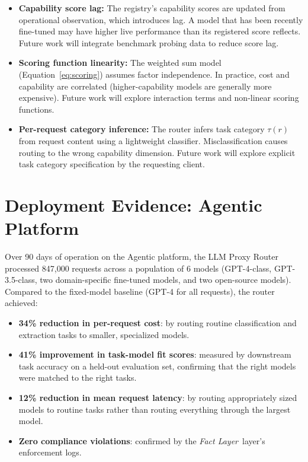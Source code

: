 \documentclass[12pt]{article}
\newcommand{\fact}{\textit{Fact Layer}}
\begin{document}
\begin{itemize}
    \item \textbf{Capability score lag:} The registry's capability scores are updated from operational observation, which introduces lag. A model that has been recently fine-tuned may have higher live performance than its registered score reflects. Future work will integrate benchmark probing data to reduce score lag.
    \item \textbf{Scoring function linearity:} The weighted sum model (Equation~\ref{eq:scoring}) assumes factor independence. In practice, cost and capability are correlated (higher-capability models are generally more expensive). Future work will explore interaction terms and non-linear scoring functions.
    \item \textbf{Per-request category inference:} The router infers task category $\tau(r)$ from request content using a lightweight classifier. Misclassification causes routing to the wrong capability dimension. Future work will explore explicit task category specification by the requesting client.
\end{itemize}

\section{Deployment Evidence: Agentic Platform}
\label{sec:deployment}

Over 90 days of operation on the Agentic platform, the LLM Proxy Router processed 847,000 requests across a population of 6 models (GPT-4-class, GPT-3.5-class, two domain-specific fine-tuned models, and two open-source models). Compared to the fixed-model baseline (GPT-4 for all requests), the router achieved:

\begin{itemize}[noitemsep]
    \item \textbf{34\% reduction in per-request cost}: by routing routine classification and extraction tasks to smaller, specialized models.
    \item \textbf{41\% improvement in task-model fit scores}: measured by downstream task accuracy on a held-out evaluation set, confirming that the right models were matched to the right tasks.
    \item \textbf{12\% reduction in mean request latency}: by routing appropriately sized models to routine tasks rather than routing everything through the largest model.
    \item \textbf{Zero compliance violations}: confirmed by the \fact\ layer's enforcement logs.
\end{itemize}
\end{document}
